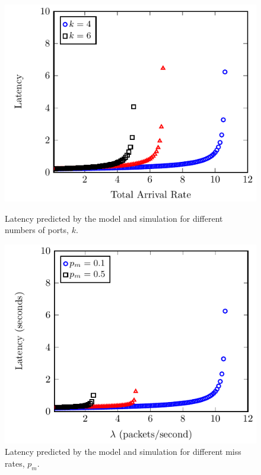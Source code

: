 \begin{figure}
	\vspace{2mm}

	\centering
	\begin{minipage}[b]{.49\textwidth}
		\includegraphics[width=\linewidth]{graphs/num_ports}
		\caption{Latency predicted by the model and simulation for different numbers
			of ports, $k$.}
		\label{fig:num_ports}
	\end{minipage}
	\hfill
	\begin{minipage}[b]{.49\textwidth}
		\includegraphics[width=\linewidth]{graphs/diff_sdn}
		\caption{Latency predicted by the model and simulation for different miss rates, $p_{m}$.}
		\label{fig:sdn_perc}
	\end{minipage}

\end{figure}

